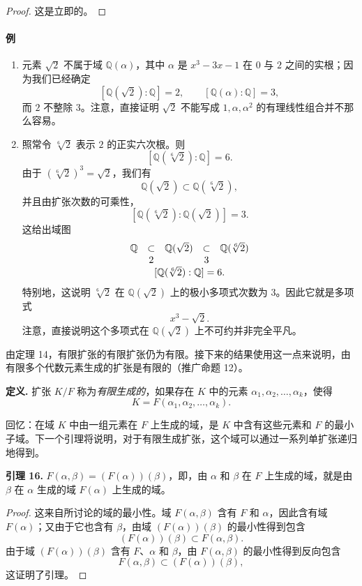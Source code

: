 \begin{proof}
	这是立即的。
\end{proof}

\paragraph{例}
\begin{enumerate}[label=(\arabic*)]
	\item 元素 $\sqrt2$ 不属于域 $\mathbb Q(\alpha)$，其中 $\alpha$ 是 $x^3-3x-1$ 在 $0$ 与 $2$ 之间的实根；因为我们已经确定
	\[
	[\mathbb Q(\sqrt2):\mathbb Q]=2,
	\qquad [\mathbb Q(\alpha):\mathbb Q]=3,
	\]
	而 $2$ 不整除 $3$。注意，直接证明 $\sqrt2$ 不能写成 $1,\alpha,\alpha^2$ 的有理线性组合并不那么容易。
	\item 照常令 $\sqrt[6]{2}$ 表示 $2$ 的正实六次根。则
	\[
	[\mathbb Q(\sqrt[6]{2}):\mathbb Q]=6.
	\]
	由于 $(\sqrt[6]{2})^3=\sqrt2$，我们有
	\[
	\mathbb Q(\sqrt2)\subset \mathbb Q(\sqrt[6]{2}),
	\]
	并且由扩张次数的可乘性，
	\[
	[\mathbb Q(\sqrt[6]{2}):\mathbb Q(\sqrt2)]=3.
	\]
	这给出域图
	\[
	\begin{array}{ccccc}
		\mathbb Q & \subset & \mathbb Q(\sqrt2) & \subset & \mathbb Q(\sqrt[6]{2})\\
		& 2 & & 3 & \\
		\multicolumn{5}{c}{[\mathbb Q(\sqrt[6]{2}):\mathbb Q]=6.}
	\end{array}
	\]
	特别地，这说明 $\sqrt[6]{2}$ 在 $\mathbb Q(\sqrt2)$ 上的极小多项式次数为 $3$。因此它就是多项式
	\[
	x^3-\sqrt2.
	\]
	注意，直接说明这个多项式在 $\mathbb Q(\sqrt2)$ 上不可约并非完全平凡。
\end{enumerate}

由定理 14，有限扩张的有限扩张仍为有限。接下来的结果使用这一点来说明，由有限多个代数元素生成的扩张是有限的（推广命题 12）。

\noindent\textbf{定义.} 扩张 $K/F$ 称为\emph{有限生成的}，如果存在 $K$ 中的元素 $\alpha_1,\alpha_2,\ldots,\alpha_k$，使得
\[
K=F(\alpha_1,\alpha_2,\ldots,\alpha_k).
\]

回忆：在域 $K$ 中由一组元素在 $F$ 上生成的域，是 $K$ 中含有这些元素和 $F$ 的最小子域。下一个引理将说明，对于有限生成扩张，这个域可以通过一系列单扩张递归地得到。

\noindent\textbf{引理 16.} $F(\alpha,\beta)=(F(\alpha))(\beta)$，即，由 $\alpha$ 和 $\beta$ 在 $F$ 上生成的域，就是由 $\beta$ 在 $\alpha$ 生成的域 $F(\alpha)$ 上生成的域。

\begin{proof}
	这来自所讨论的域的最小性。域 $F(\alpha,\beta)$ 含有 $F$ 和 $\alpha$，因此含有域 $F(\alpha)$；又由于它也含有 $\beta$，由域 $(F(\alpha))(\beta)$ 的最小性得到包含
	\[
	(F(\alpha))(\beta)\subset F(\alpha,\beta).
	\]
	由于域 $(F(\alpha))(\beta)$ 含有 $F$、$\alpha$ 和 $\beta$，由 $F(\alpha,\beta)$ 的最小性得到反向包含
	\[
	F(\alpha,\beta)\subset (F(\alpha))(\beta),
	\]
	这证明了引理。
\end{proof}

